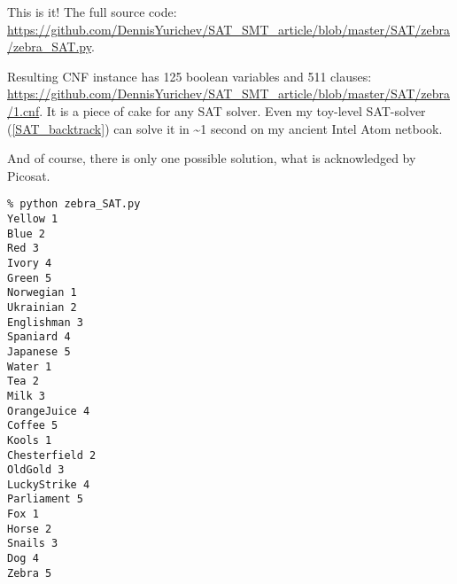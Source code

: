 This is it!
The full source code: \url{https://github.com/DennisYurichev/SAT_SMT_article/blob/master/SAT/zebra/zebra_SAT.py}.

Resulting CNF instance has 125 boolean variables and 511 clauses: \\
\url{https://github.com/DennisYurichev/SAT_SMT_article/blob/master/SAT/zebra/1.cnf}.
It is a piece of cake for any SAT solver.
Even my toy-level SAT-solver (\ref{SAT_backtrack}) can solve it in \textasciitilde{}1 second on my ancient Intel Atom netbook.

And of course, there is only one possible solution, what is acknowledged by Picosat.

\begin{lstlisting}
% python zebra_SAT.py
Yellow 1
Blue 2
Red 3
Ivory 4
Green 5
Norwegian 1
Ukrainian 2
Englishman 3
Spaniard 4
Japanese 5
Water 1
Tea 2
Milk 3
OrangeJuice 4
Coffee 5
Kools 1
Chesterfield 2
OldGold 3
LuckyStrike 4
Parliament 5
Fox 1
Horse 2
Snails 3
Dog 4
Zebra 5
\end{lstlisting}

